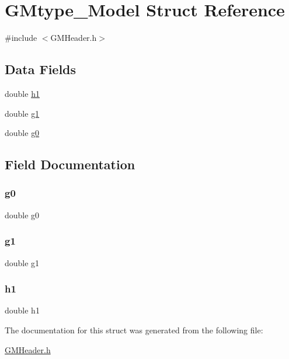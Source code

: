\hypertarget{struct_g_mtype___model}{}\section{G\+Mtype\+\_\+\+Model Struct Reference}
\label{struct_g_mtype___model}


{\ttfamily \#include $<$G\+M\+Header.\+h$>$}

\subsection*{Data Fields}
\begin{DoxyCompactItemize}
\item 
double \mbox{\hyperlink{struct_g_mtype___model_a74553021dc63dd47aa8b838f9312c599}{h1}}
\item 
double \mbox{\hyperlink{struct_g_mtype___model_adf05fcfd83be702fb6d79e601cd7df76}{g1}}
\item 
double \mbox{\hyperlink{struct_g_mtype___model_a4247e3e863cf569494a289df72e4178c}{g0}}
\end{DoxyCompactItemize}


\subsection{Field Documentation}
\mbox{\label{struct_g_mtype___model_a4247e3e863cf569494a289df72e4178c}} 
\subsubsection{\texorpdfstring{g0}{g0}}
{\footnotesize\ttfamily double g0}

\mbox{\label{struct_g_mtype___model_adf05fcfd83be702fb6d79e601cd7df76}} 
\subsubsection{\texorpdfstring{g1}{g1}}
{\footnotesize\ttfamily double g1}

\mbox{\label{struct_g_mtype___model_a74553021dc63dd47aa8b838f9312c599}} 
\subsubsection{\texorpdfstring{h1}{h1}}
{\footnotesize\ttfamily double h1}



The documentation for this struct was generated from the following file\+:\begin{DoxyCompactItemize}
\item 
\mbox{\hyperlink{_g_m_header_8h}{G\+M\+Header.\+h}}\end{DoxyCompactItemize}
